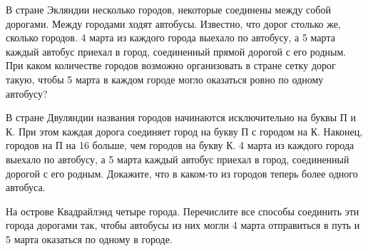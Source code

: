 ﻿
\begin{itemize}

\itA В стране Экляндии несколько городов, некоторые соединены между собой дорогами.
Между городами ходят автобусы. Известно, что дорог столько же, сколько городов.
4 марта из каждого города выехало по автобусу, а 5 марта каждый автобус приехал
в город, соединенный прямой дорогой с его родным. При каком количестве городов
возможно организовать в стране сетку дорог такую, чтобы 5 марта в каждом городе
могло оказаться ровно по одному автобусу?

\itB В стране Двуляндии названия городов начинаются исключительно на буквы П и К. При этом каждая дорога соединяет город на букву П с городом на К. Наконец, городов на П на 16 больше, чем городов на букву К. 4 марта из каждого города выехало по автобусу, а 5 марта каждый автобус приехал в город, соединенный дорогой с его родным. Докажите, что в каком-то из городов теперь более одного автобуса.

\itC На острове Квадрайлэнд четыре города. Перечислите все способы соединить
эти города дорогами так, чтобы автобусы из них могли 4 марта отправиться в путь
и 5 марта оказаться по одному в городе.
\end{itemize}